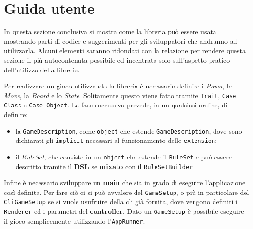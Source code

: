 \section{Guida utente}
%
In questa sezione conclusiva si mostra come la libreria può essere usata mostrando parti di codice e suggerimenti per gli sviluppatori che andranno ad utilizzarla.
%
Alcuni elementi saranno ridondati con la relazione per rendere questa sezione il più autocontenuta possibile ed incentrata solo sull'aspetto pratico dell'utilizzo della libreria.


%
Per realizzare un gioco utilizzando la libreria è necessario definire i \textit{Pawn}, le \textit{Move}, la \textit{Board} e lo \textit{State}. %
%
Solitamente questo viene fatto tramite \texttt{Trait}, \texttt{Case Class} e \texttt{Case Object}.
%
La fase successiva prevede, in un qualsiasi ordine, di definire:
\begin{itemize}
  \item la \texttt{GameDescription}, come \texttt{object} che estende \texttt{GameDescription}, dove sono dichiarati gli \texttt{implicit} necessari al funzionamento delle \texttt{extension};
  \item il \textit{RuleSet}, che consiste in un \texttt{object} che estende il \texttt{RuleSet} e può essere descritto tramite il \textbf{DSL} se \textbf{mixato} con il \texttt{RuleSetBuilder}
\end{itemize}

Infine è necessario sviluppare un \textbf{main} che sia in grado di eseguire l'applicazione così definita.
%
Per fare ciò ci si può avvalere del \texttt{GameSetup}, o più in particolare del \texttt{CliGameSetup} se si vuole usufruire della cli già fornita, dove vengono definiti i \texttt{Renderer} ed i parametri del \textbf{controller}.
%
Dato un \texttt{GameSetup} è possibile eseguire il gioco semplicemente utilizzando l'\texttt{AppRunner}.